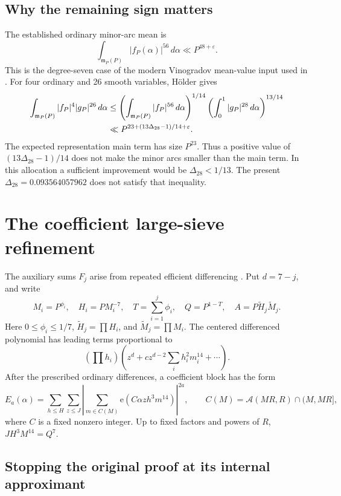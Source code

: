 \documentclass[11pt,letterpaper]{article}
\theoremstyle{remark}
\newcommand{\A}{\mathcal A}
\newcommand{\m}{\mathfrak m}
\newcommand{\eps}{\varepsilon}
\newcommand{\dd}{\,d\alpha}
\newcommand{\e}{\mathrm e}
\newcommand{\CurrentDeltaTwentyEight}{0.093564057962}
\begin{document}
\subsection{Why the remaining sign matters}

The established ordinary minor-arc mean is
\begin{equation}\label{eq:f56}
 \int_{\m_P(P)}|f_P(\alpha)|^{56}\dd\ll P^{48+\eps}.
\end{equation}
This is the degree-seven case of the modern Vinogradov mean-value input used in
\cite[Lemma~3.1]{W16}. For four ordinary and 26 smooth variables, H\"older gives
\begin{align}
 \int_{\m_P(P)}|f_P|^4|g_P|^{26}\dd
 &\le\left(\int_{\m_P(P)}|f_P|^{56}\dd\right)^{1/14}
       \left(\int_0^1|g_P|^{28}\dd\right)^{13/14}\notag\\
 &\ll P^{23+(13\Delta_{28}-1)/14+\eps}.\label{eq:gap}
\end{align}
The expected representation main term has size $P^{23}$. Thus a positive value
of $(13\Delta_{28}-1)/14$ does not make the minor arcs smaller than the main term.
In this allocation a sufficient improvement would be $\Delta_{28}<1/13$.
The present $\Delta_{28}=\CurrentDeltaTwentyEight$ does not satisfy that inequality.

\section{The coefficient large-sieve refinement}

The auxiliary sums $F_j$ arise from repeated efficient differencing
\cite[Section~2]{VW00}. Put $d=7-j$, and write
\[
 M_i=P^{\phi_i},\quad H_i=P M_i^{-7},\quad T=\sum_{i=1}^j\phi_i,
 \quad Q=P^{1-T},\quad A=P\widetilde H_j\widetilde M_j.
\]
Here $0\le\phi_i\le1/7$, $\widetilde H_j=\prod H_i$, and
$\widetilde M_j=\prod M_i$.
The centered differenced polynomial has leading terms proportional to
\[
 (\textstyle\prod h_i)
 \left(z^d+c z^{d-2}\sum_i h_i^2m_i^{14}+\cdots\right).
\]
After the prescribed ordinary differences, a coefficient block has the form
\[
 E_a(\alpha)=\sum_{h\le H}\sum_{z\le J}
       \left|\sum_{m\in C(M)}\e(C\alpha z h^3m^{14})\right|^{2a},
 \qquad C(M)=\A(MR,R)\cap(M,MR],
\]
where $C$ is a fixed nonzero integer. Up to fixed factors and powers of $R$,
$JH^3M^{14}=Q^7$.

\subsection{Stopping the original proof at its internal approximant}
\end{document}
